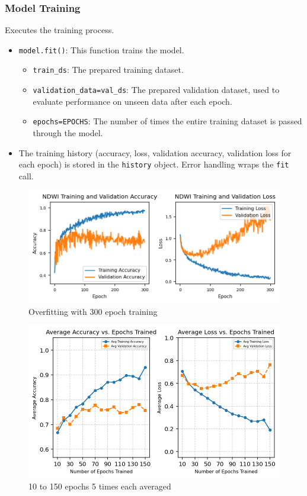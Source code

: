 \subsubsection{Model Training}
Executes the training process.
\begin{itemize}
    \item \verb|model.fit()|: This function trains the model.
    \begin{itemize}
        \item \verb|train_ds|: The prepared training dataset.
        \item \verb|validation_data=val_ds|: The prepared validation dataset, used to evaluate performance on unseen data after each epoch.
        \item \verb|epochs=EPOCHS|: The number of times the entire training dataset is passed through the model.
    \end{itemize}
    \item The training history (accuracy, loss, validation accuracy, validation loss for each epoch) is stored in the \verb|history| object. Error handling wraps the \verb|fit| call.
\end{itemize}

\begin{figure}
    \centering
    \includegraphics[width=0.5\linewidth]{contents/figures/ME overfitting example.jpg}
    \caption{Overfitting with 300 epoch training}
    \label{fig:ME overfitting}
\end{figure}

\begin{figure}
    \centering
    \includegraphics[width=0.5\linewidth]{contents/figures/ME_epoch_pathfinder_better.jpg}
    \caption{10 to 150 epochs 5 times each averaged}
    \label{fig:enter-label}
\end{figure}

